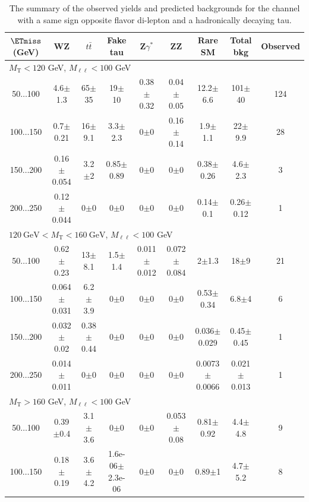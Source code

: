 \begin{landscape}
\begin{table}
\end{table}
\begin{table}
\small
\begin{center}
\caption{\label{tab:SSOStau1} The summary of the observed yields and predicted backgrounds for the channel 
with a same sign opposite flavor di-lepton and a hadronically decaying tau. }
\begin{tabular}{| c | c c c c c c  | c  c | }\hline\hline
$\ETmiss$ (GeV) & WZ & $t\bar{t}$ & Fake tau & Z$\gamma^*$ & ZZ & Rare SM & Total bkg & Observed\\\hline\hline
\multicolumn{8}{l}{$M_{\text{T}} < 120$ GeV, $M_{\ell\ell} < 100$ GeV}\\\hline\hline
50$\dots$100&4.6$\pm$1.3&65$\pm$35&19$\pm$10&0.38$\pm$0.32&0.04$\pm$0.05&12.2$\pm$6.6&101$\pm$40&124\\
100$\dots$150&0.7$\pm$0.21&16$\pm$9.1&3.3$\pm$2.3&0$\pm$0&0.16$\pm$0.14&1.9$\pm$1.1&22$\pm$9.9&28\\
150$\dots$200&0.16$\pm$0.054&3.2$\pm$2&0.85$\pm$0.89&0$\pm$0&0$\pm$0&0.38$\pm$0.26&4.6$\pm$2.3&3\\
200$\dots$250&0.12$\pm$0.044&0$\pm$0&0$\pm$0&0$\pm$0&0$\pm$0&0.14$\pm$0.1&0.26$\pm$0.12&1\\
\hline\hline
\multicolumn{8}{l}{$120~\mathrm{GeV} < M_{\text{T}} < 160~\mathrm{GeV}$, $M_{\ell\ell} < 100$ GeV}\\\hline\hline
50$\dots$100&0.62$\pm$0.23&13$\pm$8.1&1.5$\pm$1.4&0.011$\pm$0.012&0.072$\pm$0.084&2$\pm$1.3&18$\pm$9&21\\
100$\dots$150&0.064$\pm$0.031&6.2$\pm$3.9&0$\pm$0&0$\pm$0&0$\pm$0&0.53$\pm$0.34&6.8$\pm$4&6\\
150$\dots$200&0.032$\pm$0.02&0.38$\pm$0.44&0$\pm$0&0$\pm$0&0$\pm$0&0.036$\pm$0.029&0.45$\pm$0.45&1\\
200$\dots$250&0.014$\pm$0.011&0$\pm$0&0$\pm$0&0$\pm$0&0$\pm$0&0.0073$\pm$0.0066&0.021$\pm$0.013&1\\
\hline\hline
\multicolumn{8}{l}{$M_{\text{T}} > 160$ GeV, $M_{\ell\ell} < 100$ GeV}\\\hline\hline
50$\dots$100&0.39$\pm$0.4&3.1$\pm$3.6&0$\pm$0&0$\pm$0&0.053$\pm$0.08&0.81$\pm$0.92&4.4$\pm$4.8&9\\
100$\dots$150&0.18$\pm$0.19&3.6$\pm$4.2&1.6e-06$\pm$2.3e-06&0$\pm$0&0$\pm$0&0.89$\pm$1&4.7$\pm$5.2&8\\

\end{tabular}
\end{center}
\end{table}
\end{landscape}
